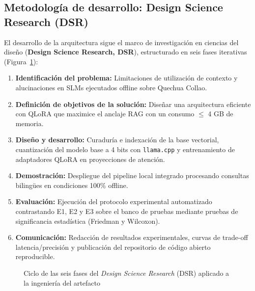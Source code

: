 \subsection{Metodología de desarrollo: Design Science Research (DSR)}
El desarrollo de la arquitectura sigue el marco de investigación en ciencias del diseño (\textbf{Design Science Research, DSR}), estructurado en seis fases iterativas (Figura~\ref{fig:ciclo_dsr}):
\begin{enumerate}
    \item \textbf{Identificación del problema:} Limitaciones de utilización de contexto y alucinaciones en SLMs ejecutados offline sobre Quechua Collao.
    \item \textbf{Definición de objetivos de la solución:} Diseñar una arquitectura eficiente con QLoRA que maximice el anclaje RAG con un consumo $\le$ 4 GB de memoria.
    \item \textbf{Diseño y desarrollo:} Curaduría e indexación de la base vectorial, cuantización del modelo base a 4 bits con \texttt{llama.cpp} y entrenamiento de adaptadores QLoRA en proyecciones de atención.
    \item \textbf{Demostración:} Despliegue del pipeline local integrado procesando consultas bilingües en condiciones 100\% offline.
    \item \textbf{Evaluación:} Ejecución del protocolo experimental automatizado contrastando E1, E2 y E3 sobre el banco de pruebas mediante pruebas de significancia estadística (Friedman y Wilcoxon).
    \item \textbf{Comunicación:} Redacción de resultados experimentales, curvas de trade-off latencia/precisión y publicación del repositorio de código abierto reproducible.
\end{enumerate}

\begin{figure}[H]
\centering
{}
\caption{Ciclo de las seis fases del \textit{Design Science Research} (DSR) aplicado a la ingeniería del artefacto}
\label{fig:ciclo_dsr}
\end{figure}


